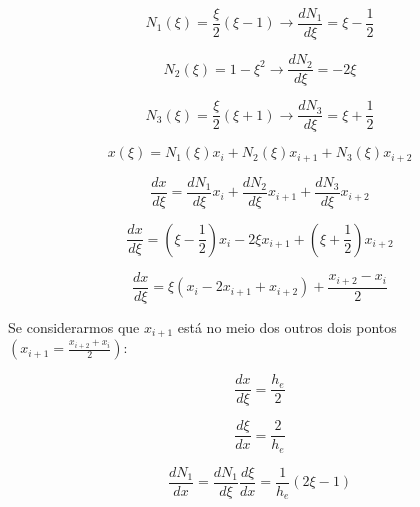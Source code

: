         \begin{equation*}
            N_1(\xi) = \frac{\xi}{2}\left(\xi-1\right) \rightarrow \frac{dN_1}{d\xi} = \xi-\frac{1}{2}
        \end{equation*}

        \begin{equation*}
            N_2(\xi) = 1-\xi^2 \rightarrow \frac{dN_2}{d\xi} = -2\xi
        \end{equation*}

        \begin{equation*}
            N_3(\xi) = \frac{\xi}{2}\left(\xi+1\right) \rightarrow \frac{dN_3}{d\xi} = \xi+\frac{1}{2}
        \end{equation*}

        \begin{equation*}
            x(\xi) = N_1(\xi) x_i + N_2(\xi) x_{i+1} + N_3(\xi) x_{i+2}
        \end{equation*}

       \begin{equation*}
            \frac{dx}{d\xi} = \frac{dN_1}{d\xi} x_i + \frac{dN_2}{d\xi} x_{i+1} + \frac{dN_3}{d\xi} x_{i+2}
       \end{equation*}

       \begin{equation*}
            \frac{dx}{d\xi} = \left(\xi-\frac{1}{2}\right) x_i - 2\xi x_{i+1} + \left(\xi+\frac{1}{2}\right) x_{i+2}
       \end{equation*}

       \begin{equation*}
            \frac{dx}{d\xi} = \xi \left(x_i - 2x_{i+1} + x_{i+2}\right) + \frac{x_{i+2}-x_i}{2}
       \end{equation*}

       Se considerarmos que $x_{i+1}$ está no meio dos outros dois pontos $\left(x_{i+1} = \frac{x_{i+2}+x_i}{2}\right)$:

       \begin{equation*}
            \frac{dx}{d\xi} =\frac{h_e}{2}
       \end{equation*}

       \begin{equation*}
            \frac{d\xi}{dx} =\frac{2}{h_e}
       \end{equation*}

       \begin{equation*}
            \frac{dN_1}{dx} = \frac{dN_1}{d\xi} \frac{d\xi}{dx}  = \frac{1}{h_e}\left(2\xi-1\right)
        \end{equation*}

